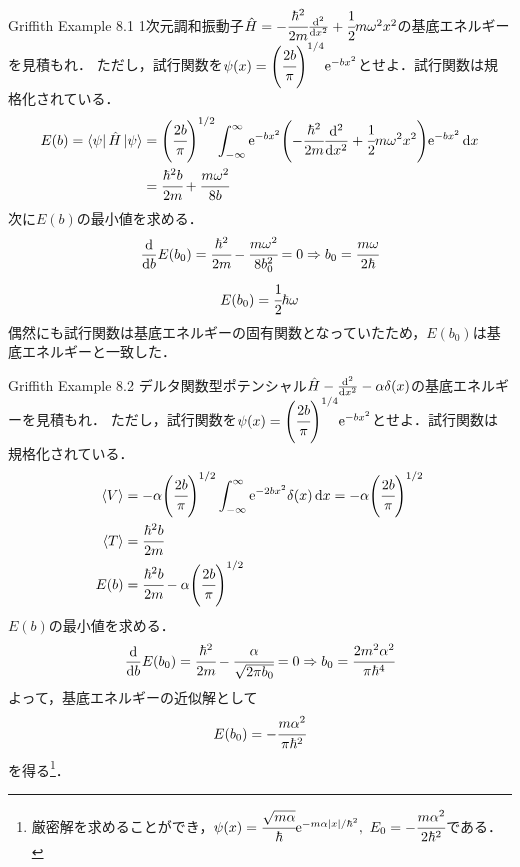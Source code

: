 \documentclass{report}
\begin{document}
  \begin{myexc}{Griffith Example 8.1}{}
    1次元調和振動子$\hat{H} = -\cfrac{\hbar^2}{2m}\dv[2]{x} + \cfrac{1}{2}m\omega^2 x^2$の基底エネルギーを見積もれ．
    ただし，試行関数を$\psi(x) = \qty(\cfrac{2b}{\pi})^{1/4}\mathrm{e}^{-bx^2}$とせよ．試行関数は規格化されている．
    \tcblower
    \begin{align}
      E(b) = \bra{\psi}\hat{H}\ket{\psi} &= \qty(\cfrac{2b}{\pi})^{1/2}\int_{-\infty}^{\infty}\mathrm{e}^{-bx^2}\qty(-\cfrac{\hbar^2}{2m}\dv[2]{x} + \cfrac{1}{2}m\omega^2x^2)\mathrm{e}^{-bx^2}\dd{x}\\
      &=\cfrac{\hbar^2b}{2m}+\cfrac{m\omega^2}{8b}
    \end{align}
    次に$E(b)$の最小値を求める．
    \begin{align}
      \dv{b}E(b_0) = \cfrac{\hbar^2}{2m} - \cfrac{m\omega^2}{8b_{0}^2} = 0\Rightarrow b_0 = \cfrac{m\omega}{2\hbar}
    \end{align}
    \begin{align}
      E(b_0) = \cfrac{1}{2}\hbar\omega
    \end{align}
    偶然にも試行関数は基底エネルギーの固有関数となっていたため，$E(b_0)$は基底エネルギーと一致した．
  \end{myexc}
  \begin{myexc}{Griffith Example 8.2}{}
    デルタ関数型ポテンシャル$\hat{H} - \dv[2]{x}-\alpha \delta(x)$の基底エネルギーを見積もれ．
    ただし，試行関数を$\psi(x) = \qty(\cfrac{2b}{\pi})^{1/4}\mathrm{e}^{-bx^2}$とせよ．試行関数は規格化されている．
    \tcblower
    \begin{align}
      \ev{V} &= -\alpha \qty(\cfrac{2b}{\pi})^{1/2}\int_{-\infty}^{\infty}\e^{-2bx^2}\delta(x)\dd{x} = -\alpha\qty(\cfrac{2b}{\pi})^{1/2}\\
      \ev{T} &= \cfrac{\hbar^2 b}{2m}\\
      E(b) &= \cfrac{\hbar^2 b}{2m} - \alpha\qty(\cfrac{2b}{\pi})^{1/2}
    \end{align}
    $E(b)$の最小値を求める．
    \begin{align}
      \dv{b}E(b_0) = \cfrac{\hbar^2}{2m} - \cfrac{\alpha}{\sqrt{2\pi b_0}} = 0\Rightarrow b_0=\cfrac{2m^2\alpha^2}{\pi\hbar^4}
    \end{align}
    よって，基底エネルギーの近似解として
    \begin{align}
      E(b_0) = -\cfrac{m\alpha^2}{\pi\hbar^2}
    \end{align}
    を得る\footnote{
      厳密解を求めることができ，$\psi(x) = \cfrac{\sqrt{m\alpha}}{\hbar}\mathrm{e}^{-m\alpha\abs{x}/\hbar^2},\ E_0 = -\cfrac{m\alpha^2}{2\hbar^2}$である．
    }．
  \end{myexc}
\end{document}
